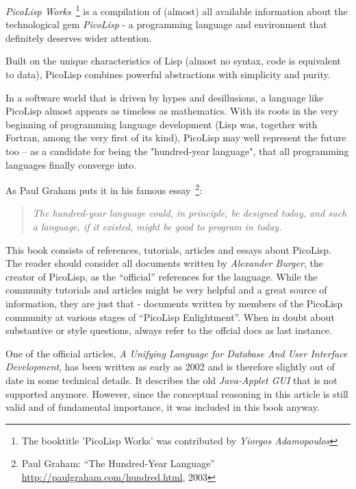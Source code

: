 %
%

\preface

\emph{PicoLisp Works}~\footnote{The booktitle 'PicoLisp Works' was
  contributed by \emph{Yiorgos Adamopoulos}} is a compilation of
(almost) all available information about the technological gem
\emph{PicoLisp} - a programming language and environment that
definitely deserves wider attention.

Built on the unique characteristics of Lisp (almost no syntax, code is
equivalent to data), PicoLisp combines powerful abstractions with
simplicity and purity.

In a software world that is driven by hypes and desillusions, a
language like PicoLisp almost appears as timeless as mathematics. With
its roots in the very beginning of programming language development
(Lisp was, together with Fortran, among the very first of its kind),
PicoLisp may well represent the future too -- as a candidate for being
the "hundred-year language", that all programming languages finally
converge into. 

As Paul Graham puts it in his famous essay~\footnote{Paul Graham: ``The Hundred-Year Language'' \url{http://paulgraham.com/hundred.html}, 2003}:

\begin{verse}
  \textit{The hundred-year language could, in principle, be
    designed today, and such a language, if it existed, might be
    good to program in today.}  
\end{verse}

This book consists of references, tutorials, articles and essays about
PicoLisp. The reader should consider all documents written by
\emph{Alexander Burger}, the creator of PicoLisp, as the ``official''
references for the language. While the community tutorials and
articles might be very helpful and a great source of information,
they are just that - documents written by members of the PicoLisp
community at various stages of ``PicoLisp Enlightment''. When in doubt
about substantive or style questions, always refer to the offcial docs
as last instance. 

One of the official articles, \emph{A Unifying Language for Database
  And User Interface Development}, has been written as early as 2002
and is therefore slightly out of date in some technical details. It
describes the old \emph{Java-Applet GUI} that is not supported
anymore. However, since the conceptual reasoning in this article is
still valid and of fundamental importance, it was included in this
book anyway.

